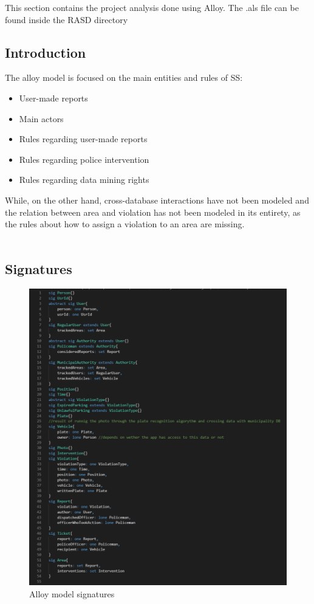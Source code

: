 

This section contains the project analysis done using Alloy. The .als file can be found inside the RASD directory \\
\subsection{Introduction}
The alloy model is focused on the main entities and rules of SS:
\begin{itemize}
	\item User-made reports
	\item Main actors
	\item Rules regarding user-made reports
	\item Rules regarding police intervention
	\item Rules regarding data mining rights
\end{itemize}
While, on the other hand, cross-database interactions have not been modeled and the relation between area and violation has not been modeled in its entirety, as the rules about how to assign a violation to an area are missing.\\  
\\
\newpage
\subsection{Signatures}
\begin{figure}[h!]
	\includegraphics[scale=0.65 ]{Images/Signatures_1-1}
	\caption{Alloy model signatures}
\end{figure}
\newpage
